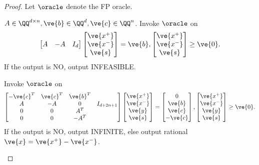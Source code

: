 \begin{proof}
Let $\oracle$ denote the FP oracle. 
\begin{algorithmic}
\Require $A \in \QQ^{d \times n}, \ve{b} \in \QQ^{d}, \ve{c} \in \QQ^{n}$.
\State Invoke $\oracle$ on 
\begin{equation}\label{eq:LPfeas}
\begin{bmatrix} A & -A & I_d \end{bmatrix} \begin{bmatrix} \ve{x^+} \\ \ve{x^-} \\ \ve{s} \end{bmatrix} = \ve{b}, \begin{bmatrix} \ve{x^+} \\ \ve{x^-} \\ \ve{s} \end{bmatrix} \ge \ve{0}.
\end{equation}
If the output is NO, output INFEASIBLE.

\State Invoke $\oracle$ on 
\begin{equation}\label{eq:LPfinite}
\begin{bmatrix}-\ve{c}^T & \ve{c}^T & \ve{b}^T & \\ A & -A & 0 & I_{d+2n+1} \\ 0 & 0 & A^T & \\ 0 & 0 & -A^T & \end{bmatrix} \begin{bmatrix} \ve{x^+} \\ \ve{x^-} \\ \ve{y} \\ \ve{s} \end{bmatrix} = \begin{bmatrix} 0 \\ \ve{b} \\ \ve{c} \\ -\ve{c} \end{bmatrix}, \begin{bmatrix} \ve{x^+} \\ \ve{x^-} \\ \ve{y} \\ \ve{s} \end{bmatrix} \ge \ve{0}.
\end{equation}
If the output is NO, output INFINITE, else output rational $\ve{x} = \ve{x^+} - \ve{x^-}$.
\end{algorithmic}


\end{proof}
